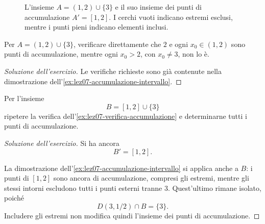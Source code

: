 \begin{figure}[htbp]
  \centering
  
  \caption{L'insieme \(A=(1,2)\cup\{3\}\)
  e il suo insieme dei punti di accumulazione
  \(A'=[1,2]\). I cerchi vuoti indicano
  estremi esclusi, mentre i punti pieni
  indicano elementi inclusi.}
  \label{fig:lez07-accumulazione}
\end{figure}

\begin{exercise}
\label{ex:lez07-verifica-accumulazione}
Per \(A=(1,2)\cup\{3\}\), verificare direttamente
che \(2\) e ogni \(x_0\in(1,2)\) sono punti
di accumulazione, mentre ogni \(x_0>2\),
con \(x_0\ne3\), non lo è.
\end{exercise}

\begin{proof}[Soluzione dell'esercizio]
Le verifiche richieste sono già contenute nella dimostrazione
dell'\cref{ex:lez07-accumulazione-intervallo}.
\end{proof}

\begin{exercise}
\label{ex:lez07-accumulazione-chiuso}
Per l'insieme
\[
  B=[1,2]\cup\{3\}
\]
ripetere la verifica dell'\cref{ex:lez07-verifica-accumulazione}
e determinarne tutti i punti di accumulazione.
\end{exercise}

\begin{proof}[Soluzione dell'esercizio]
Si ha ancora
\[
  B'=[1,2].
\]

La dimostrazione dell'\cref{ex:lez07-accumulazione-intervallo}
si applica anche a \(B\): i punti di \([1,2]\) sono
ancora di accumulazione, compresi gli estremi,
mentre gli stessi intorni escludono tutti i punti esterni
tranne \(3\). Quest'ultimo rimane isolato, poiché
\[
  D(3,1/2)\cap B=\{3\}.
\]
Includere gli estremi non modifica quindi l'insieme
dei punti di accumulazione.
\end{proof}
